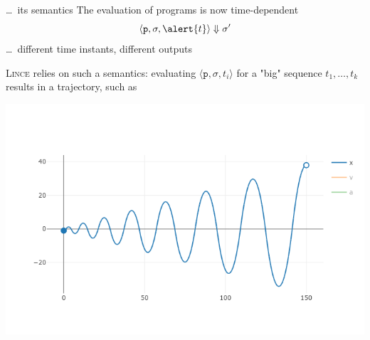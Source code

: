 \documentclass{beamer}
\begin{document}
\begin{frame}{ \dots\ its semantics }
        The evaluation of programs is now \alert{time-dependent}
        \[
                \langle \mathtt{p}, \sigma, \alert{t} \rangle \Downarrow \sigma'
        \]
        \dots\ different time instants, different outputs

        \textsc{Lince} relies on such a semantics: evaluating
        $\langle \mathtt{p}, \sigma, t_i \rangle$ for a "big"
        sequence $t_1, \dots, t_k$ results in a trajectory, such as

        \begin{center}
                \includegraphics[scale=.22]{./images/traj.png}
        \end{center}
\end{frame}
\end{document}
